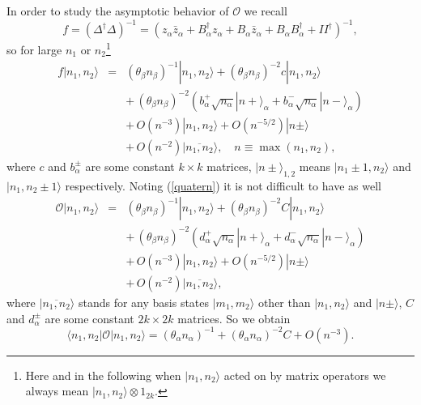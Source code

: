 \documentclass[a4paper,a4paper]{article}
\begin{document}
In order to study the asymptotic behavior of $\mathcal{O}$ we recall%
\begin{equation}
f =(\Delta ^{\dagger }\Delta )^{-1}=(z_{\alpha }\bar{z}_{\alpha
}+B_\alpha^\dag z_{\alpha }+B_\alpha\bar{z}_{\alpha }+B_\alpha
B_\alpha^\dag+II^\dag)^{-1},
\end{equation}%
so for large $n_{1}$ or $n_{2}$\footnote{%
Here and in the following when $|n_{1},n_{2}\rangle $ acted on by matrix
operators we always mean $|n_{1},n_{2}\rangle \otimes 1_{2k}$.}%
\begin{eqnarray}
f|n_{1},n_{2}\rangle &=&(\theta_\beta n_\beta)^{-1}|n_{1},n_{2}\rangle +(\theta_\beta n_\beta)^{-2}c|n_{1},n_{2}\rangle \nonumber\\
&&+\,(\theta_\beta
n_\beta)^{-2}(b^+_\alpha\sqrt{n_\alpha}|n+\rangle_\alpha+b^-_\alpha\sqrt{n_\alpha}|n-\rangle_\alpha) \nonumber\\
&&+\,O(n^{-3})|n_{1},n_{2}\rangle+O(n^{-5/2})|n\pm\rangle \nonumber\\
&&+\,O(n^{-2})|\overline{n_{1},n_{2}}\rangle,\quad
n\equiv\max(n_{1},n_{2}),
\end{eqnarray}%
where $c$ and $b^\pm_\alpha$ are some constant $k\times k$ matrices, $|n\pm\rangle_{1,2}$ means $|n_{1}\pm 1,n_{2}\rangle$ and $|n_{1},n_{2}\pm 1\rangle$ respectively.
Noting (\ref{quatern}) it is not difficult to have as well%
\begin{eqnarray}
\mathcal{O}|n_{1},n_{2}\rangle &=&(\theta_\beta n_\beta)^{-1}|n_{1},n_{2}\rangle +(\theta_\beta n_\beta)^{-2}C|n_{1},n_{2}\rangle \nonumber\\
&&+\,(\theta_\beta
n_\beta)^{-2}(d^+_\alpha\sqrt{n_\alpha}|n+\rangle_\alpha+d^-_\alpha\sqrt{n_\alpha}|n-\rangle_\alpha) \nonumber\\
&&+\,O(n^{-3})|n_{1},n_{2}\rangle+O(n^{-5/2})|n\pm\rangle \nonumber\\
&&+\,O(n^{-2})|\overline{n_{1},n_{2}}\rangle,
\end{eqnarray}%
where $|\overline{n_{1},n_{2}}\rangle$ stands for any basis states
$|m_{1},m_{2}\rangle$ other than $|n_{1},n_{2}\rangle$ and
$|n\pm\rangle$, $C$ and $d^\pm_\alpha$ are some constant $2k\times
2k$ matrices. So we obtain%
\begin{equation}
\langle n_{1},n_{2}|\mathcal{O}|n_{1},n_{2}\rangle =(\theta_\alpha
n_\alpha)^{-1}+(\theta_\alpha n_\alpha)^{-2}C+O(n^{-3}). \label{O}
\end{equation}
\end{document}
